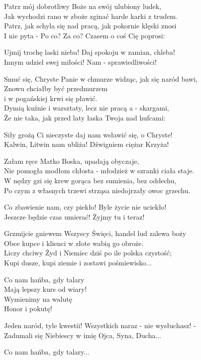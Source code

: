\begin{textn}

    Patrz mój dobrotliwy Boże na swój ulubiony ludek,\\
    Jak wychodzi rano w zboże zginać harde karki z trudem.\\
    Patrz, jak schyla się nad pracą, jak pokornie klęski znosi\\
    I nie pyta - Po co? Za co? Czasem o coś Cię poprosi:

    Ujmij trochę laski nieba! Daj spokoju w zamian, chleba!\\
    Innym udziel swej miłości! Nam - sprawiedliwości!

    Smuć się, Chryste Panie w chmurze widząc, jak się naród bawi,\\
    Znowu chciałby być przedmurzem\\
	i w pogańskiej krwi się pławić.\\
    Dymią kuźnie i warsztaty, lecz nie pracą a - skargami,\\
    Że nie taka, jak przed laty łaska Twoja nad hufcami:

    Siły grożą Ci nieczyste daj nam wsławić się, o Chryste!\\
    Kalwin, Litwin nam ubliża! Dźwigniem ciężar Krzyża!
 
    Załam ręce Matko Boska, upadają obyczaje,\\
    Nie pomogła modłom chłosta - młodzież w szranki ciała staje.\\
    W nędzy gzi się krew gorąca bez sumienia, bez oddechu,\\
    Po czym z własnych trzewi strząsa niedojrzały owoc grzechu.

    Co zbawienie nam, czy piekło! Byle życie nie uciekło!\\
    Jeszcze będzie czas umierać! Żyjmy tu i teraz!

    Grzmijcie gniewem Wszyscy Święci, handel lud zalewa boży\\
    Obce kupce i klienci w złote wabią go obroże.\\
    Liczy chciwy Żyd i Niemiec dziś po ile polska czystość;\\
    Kupi dusze, kupi ziemie i zostawi pośmiewisko...

    Co nam hańba, gdy talary\\
    Mają lepszy kurs od wiary!\\
    Wymienimy na walutę\\
    Honor i pokutę!

    Jeden naród, tyle kwestii! Wszystkich naraz - nie wysłuchasz! -\\
    Zadumali się Niebiescy w imię Ojca, Syna, Ducha...

    Co nam hańba, gdy talary...

\end{textn}
